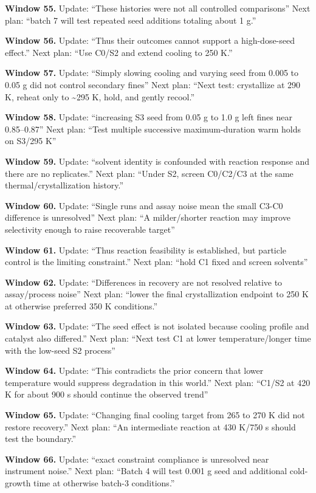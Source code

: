 \documentclass[10pt,a4paper]{article}
\begin{document}
\textbf{Window 55.} Update: ``These histories were not all controlled comparisons'' Next plan: ``batch 7 will test repeated seed additions totaling about 1 g.''

\textbf{Window 56.} Update: ``Thus their outcomes cannot support a high-dose-seed effect.'' Next plan: ``Use C0/S2 and extend cooling to 250 K.''

\textbf{Window 57.} Update: ``Simply slowing cooling and varying seed from 0.005 to 0.05 g did not control secondary fines'' Next plan: ``Next test: crystallize at 290 K, reheat only to \textasciitilde295 K, hold, and gently recool.''

\textbf{Window 58.} Update: ``increasing S3 seed from 0.05 g to 1.0 g left fines near 0.85--0.87'' Next plan: ``Test multiple successive maximum-duration warm holds on S3/295 K''

\textbf{Window 59.} Update: ``solvent identity is confounded with reaction response and there are no replicates.'' Next plan: ``Under S2, screen C0/C2/C3 at the same thermal/crystallization history.''

\textbf{Window 60.} Update: ``Single runs and assay noise mean the small C3-C0 difference is unresolved'' Next plan: ``A milder/shorter reaction may improve selectivity enough to raise recoverable target''

\textbf{Window 61.} Update: ``Thus reaction feasibility is established, but particle control is the limiting constraint.'' Next plan: ``hold C1 fixed and screen solvents''

\textbf{Window 62.} Update: ``Differences in recovery are not resolved relative to assay/process noise'' Next plan: ``lower the final crystallization endpoint to 250 K at otherwise preferred 350 K conditions.''

\textbf{Window 63.} Update: ``The seed effect is not isolated because cooling profile and catalyst also differed.'' Next plan: ``Next test C1 at lower temperature/longer time with the low-seed S2 process''

\textbf{Window 64.} Update: ``This contradicts the prior concern that lower temperature would suppress degradation in this world.'' Next plan: ``C1/S2 at 420 K for about 900 s should continue the observed trend''

\textbf{Window 65.} Update: ``Changing final cooling target from 265 to 270 K did not restore recovery.'' Next plan: ``An intermediate reaction at 430 K/750 s should test the boundary.''

\textbf{Window 66.} Update: ``exact constraint compliance is unresolved near instrument noise.'' Next plan: ``Batch 4 will test 0.001 g seed and additional cold-growth time at otherwise batch-3 conditions.''
\end{document}
